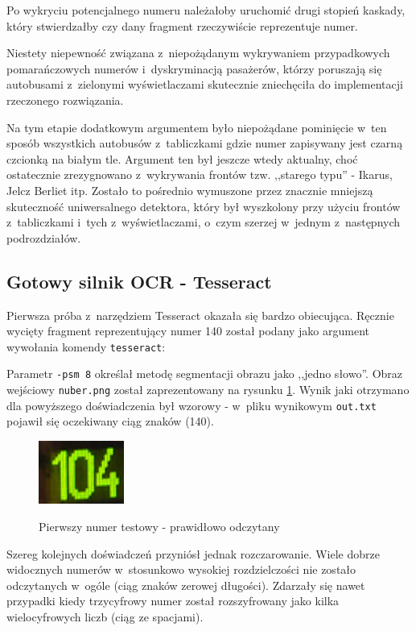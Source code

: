Po wykryciu potencjalnego numeru należałoby uruchomić drugi stopień
kaskady, który stwierdzałby czy dany fragment rzeczywiście reprezentuje
numer.

Niestety niepewność związana z~niepożądanym wykrywaniem przypadkowych
pomarańczowych numerów i~dyskryminacją pasażerów, którzy
poruszają się autobusami z~zielonymi wyświetlaczami skutecznie
zniechęciła do implementacji rzeczonego rozwiązania.

Na tym etapie dodatkowym argumentem było niepożądane 
pominięcie w~ten sposób
wszystkich autobusów z~tabliczkami gdzie numer zapisywany jest czarną
czcionką na białym tle. Argument ten był jeszcze wtedy aktualny, choć
ostatecznie zrezygnowano z~wykrywania frontów tzw. ,,starego typu'' -
Ikarus, Jelcz Berliet itp. Zostało to pośrednio wymuszone przez 
znacznie mniejszą skuteczność uniwersalnego detektora, który był
wyszkolony przy użyciu frontów z~tabliczkami i~tych z~wyświetlaczami, 
o~czym szerzej w~jednym z~następnych podrozdziałów.

\subsection{Gotowy silnik OCR - Tesseract}

Pierwsza próba z~narzędziem Tesseract okazała się bardzo obiecująca.
Ręcznie wycięty fragment reprezentujący numer 140 został podany 
jako argument wywołania komendy \verb|tesseract|:



Parametr \verb|-psm 8| określał metodę segmentacji obrazu jako ,,jedno
słowo''. Obraz wejściowy \verb|nuber.png| został zaprezentowany
na rysunku \ref{fig:sample_tesseract_input}. Wynik jaki otrzymano dla 
powyższego doświadczenia
był wzorowy - w~pliku wynikowym \verb|out.txt| pojawił
się oczekiwany ciąg znaków (140).

\begin{figure}[h!]
    \caption{Pierwszy numer testowy - prawidłowo odczytany}
    \centering
    \includegraphics[width=0.25\textwidth]{img/exp_number_01}
    \label{fig:sample_tesseract_input}
\end{figure}

Szereg kolejnych doświadczeń przyniósł jednak rozczarowanie. 
Wiele dobrze widocznych numerów w~stosunkowo wysokiej rozdzielczości 
nie zostało odczytanych w~ogóle (ciąg znaków zerowej długości). Zdarzały 
się nawet przypadki kiedy trzycyfrowy numer został rozszyfrowany jako
kilka wielocyfrowych liczb (ciąg ze spacjami).

